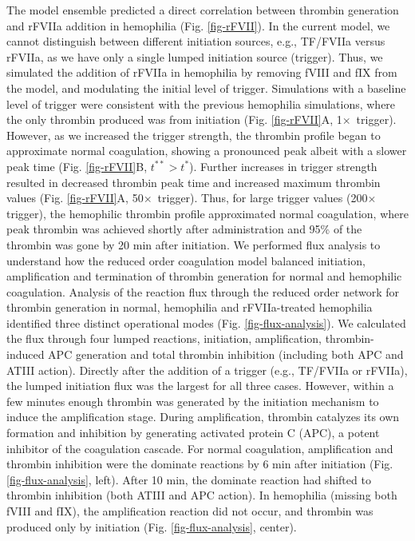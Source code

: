 \documentclass[processes,article,received,moreauthors,pdftex,12pt,a4paper]{mdpi}
\begin{document}
The model ensemble predicted a direct correlation between thrombin generation and rFVIIa addition in hemophilia (Fig. \ref{fig-rFVII}).
In the current model, we cannot distinguish between different initiation sources, e.g., TF/FVIIa versus rFVIIa, as we have only a single lumped initiation source (trigger).
Thus, we simulated the addition of rFVIIa in hemophilia by removing fVIII and fIX from the model, and modulating the initial level of trigger.
Simulations with a baseline level of trigger were consistent with the previous hemophilia simulations, where the only thrombin produced was from initiation (Fig. \ref{fig-rFVII}A, 1$\times$~trigger).
However, as we increased the trigger strength, the thrombin profile began to approximate normal coagulation, showing a pronounced peak albeit with a slower peak time (Fig. \ref{fig-rFVII}B, $t^{**}>t^{*}$).
Further increases in trigger strength resulted in decreased thrombin peak time and increased maximum thrombin values (Fig. \ref{fig-rFVII}A, 50$\times$~trigger). 
Thus, for large trigger values (200$\times$trigger), the hemophilic thrombin profile approximated normal coagulation, where peak thrombin was achieved shortly 
after administration and 95\% of the thrombin was gone by 20 min after initiation. 
We performed flux analysis to understand how the reduced order coagulation model balanced initiation, amplification and termination of thrombin generation for normal and hemophilic coagulation.
Analysis of the reaction flux through the reduced order network for thrombin generation in normal, hemophilia and rFVIIa-treated hemophilia identified three distinct operational modes (Fig. \ref{fig-flux-analysis}).
We calculated the flux through four lumped reactions, initiation, amplification, thrombin-induced APC generation and total thrombin inhibition (including both APC and ATIII action).
Directly after the addition of a trigger (e.g., TF/FVIIa or rFVIIa), the lumped initiation flux was the largest for all three cases.
However, within a few minutes enough thrombin was generated by the initiation mechanism to induce the amplification stage. 
During amplification, thrombin catalyzes its own formation and inhibition by generating activated protein C (APC), a potent inhibitor of the coagulation cascade.
For normal coagulation, amplification and thrombin inhibition were the dominate reactions by 6 min after initiation (Fig. \ref{fig-flux-analysis}, left). 
After 10 min, the dominate reaction had shifted to thrombin inhibition (both ATIII and APC action). 
In hemophilia (missing both fVIII and fIX), the amplification reaction did not occur, and thrombin was produced only by initiation (Fig. \ref{fig-flux-analysis}, center).
\end{document}
